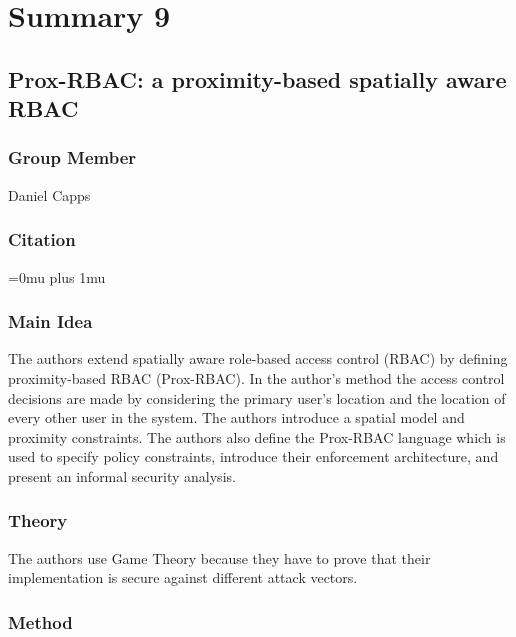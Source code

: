 \section{Summary 9}

\noindent
\subsection{{P}rox-{R}{B}{A}{C}: a proximity-based spatially aware {R}{B}{A}{C}}

\subsubsection{Group Member}

\noindent
Daniel Capps

\noindent
\subsubsection{Citation}

\Urlmuskip=0mu plus 1mu\relax


\subsubsection{Main Idea}

\noindent
The authors extend spatially aware role-based access control (RBAC) by defining proximity-based RBAC (Prox-RBAC).  In the author’s method the access control decisions are made by considering the primary user’s location and the location of every other user in the system. The authors introduce a spatial model and proximity constraints. The authors also define the Prox-RBAC language which is used to specify policy constraints, introduce their enforcement architecture, and present an informal security analysis. 

\subsubsection{Theory}

\noindent
The authors use Game Theory because they have to prove that their implementation is secure against different attack vectors.

\subsubsection{Method}

